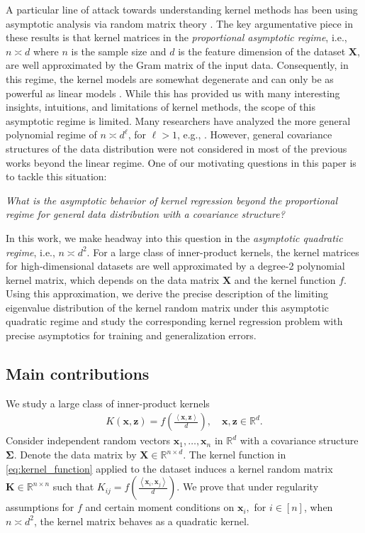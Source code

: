 \documentclass[twoside,11pt]{article}
\newcommand{\inner}[1]{\left\langle #1 \right\rangle}
\newcommand{\R}{\mathbb{R}}
\def\bK{{\boldsymbol K}}
\def\bX{{\boldsymbol X}}
\def\bx{{\boldsymbol x}}
\def\bz{{\boldsymbol z}}
\def\bSigma{{\boldsymbol \Sigma}}
\renewcommand{\bK}{\boldsymbol{K}}
\newcommand{\x}{\boldsymbol{x}}
\newcommand{\z}{\boldsymbol{z}}
\newcommand{\1}{\mathbf{1}}
\newcommand{\round}[1]{\left(#1\right)}
\begin{document}
A particular line of attack towards understanding kernel methods has been using asymptotic analysis via random matrix theory \citep{el2010spectrum,mei2019generalization,bartlett2021deep,montanari2020interpolation}.  The key argumentative piece in these results is that kernel matrices in the \textit{proportional asymptotic regime}, i.e., $n\asymp d$ where $n$ is the sample size and $d$ is the feature dimension of the dataset $\bX$, are well approximated by the Gram matrix of the input data. 
Consequently, in this regime, the kernel models are somewhat degenerate and can only be as powerful as linear models \citep{bartlett2021deep,ba2022high}.
While this has provided us with many interesting insights, intuitions, and limitations of kernel methods, the scope of this asymptotic regime is limited. Many researchers have analyzed the more general polynomial regime of $n\asymp d^\ell$, for $\ell>1$, e.g., \cite{mei2021generalization,donhauser2021rotational,xiao2022precise,lu2022equivalence,dubova2023universality,wang2023overparameterized}. However, general covariance structures of the data distribution were not considered in most of the previous works beyond the linear regime. One of our motivating questions in this paper is to tackle this situation:
\begin{center}
    \textit{What is the asymptotic behavior of kernel regression beyond the proportional regime for general data distribution with a covariance structure?}
\end{center}

In this work, we make headway into this question in the \textit{asymptotic quadratic regime}, i.e., $n\asymp d^2$. For a large class of inner-product kernels, the kernel matrices for high-dimensional datasets are well approximated by a degree-2 polynomial kernel matrix, which depends on the data matrix $\bX$ and the kernel function $f$. Using this approximation, we derive the precise description of the limiting eigenvalue distribution of the kernel random matrix under this asymptotic quadratic regime and study the corresponding kernel regression problem with precise asymptotics for training and generalization errors. 


\subsection{Main contributions}
We study a large class of inner-product kernels
\begin{align} \label{eq:kernel_function}
    K(\bx,\bz) = f\round{\frac{\inner{\x,\z}}{d}}, \quad  \bx, \bz  \in \mathbb R^d.
\end{align}
Consider independent random vectors $\bx_1,\dots, \bx_n$ in $\mathbb R^{d}$ with a  covariance  structure $\bSigma$.  Denote the data matrix by $\bX\in\R^{n\times d}$. The kernel function in \eqref{eq:kernel_function} applied to the dataset induces a kernel random matrix $\bK\in \mathbb R^{n\times n}$ such that 
$K_{ij}= f\round{\frac{\inner{\bx_i,\bx_j}}{d}}$. We prove that under regularity assumptions for $f$ and certain moment conditions on $\bx_i,$ for $i\in [n]$, when $n\asymp d^2$, the kernel matrix behaves as a quadratic kernel.
\end{document}
